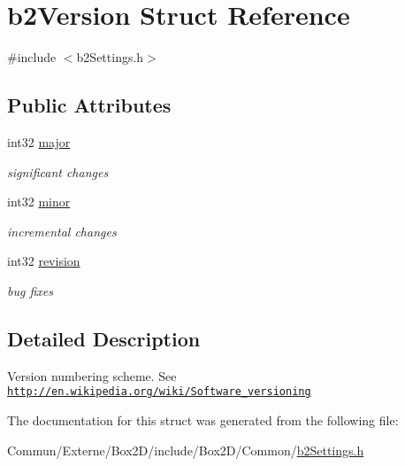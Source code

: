 \hypertarget{structb2_version}{}\section{b2\+Version Struct Reference}
\label{structb2_version}


{\ttfamily \#include $<$b2\+Settings.\+h$>$}

\subsection*{Public Attributes}
\begin{DoxyCompactItemize}
\item 
int32 \hyperlink{structb2_version_a720da8e346364d1cb34d176125380b44}{major}\hypertarget{structb2_version_a720da8e346364d1cb34d176125380b44}{}\label{structb2_version_a720da8e346364d1cb34d176125380b44}

\begin{DoxyCompactList}\small\item\em significant changes \end{DoxyCompactList}\item 
int32 \hyperlink{structb2_version_a115b8797a6e0b8e53f54502bd20d89da}{minor}\hypertarget{structb2_version_a115b8797a6e0b8e53f54502bd20d89da}{}\label{structb2_version_a115b8797a6e0b8e53f54502bd20d89da}

\begin{DoxyCompactList}\small\item\em incremental changes \end{DoxyCompactList}\item 
int32 \hyperlink{structb2_version_a395cfe1434e348115d2ead3d72b88847}{revision}\hypertarget{structb2_version_a395cfe1434e348115d2ead3d72b88847}{}\label{structb2_version_a395cfe1434e348115d2ead3d72b88847}

\begin{DoxyCompactList}\small\item\em bug fixes \end{DoxyCompactList}\end{DoxyCompactItemize}


\subsection{Detailed Description}
Version numbering scheme. See \href{http://en.wikipedia.org/wiki/Software_versioning}{\tt http\+://en.\+wikipedia.\+org/wiki/\+Software\+\_\+versioning} 

The documentation for this struct was generated from the following file\+:\begin{DoxyCompactItemize}
\item 
Commun/\+Externe/\+Box2\+D/include/\+Box2\+D/\+Common/\hyperlink{b2_settings_8h}{b2\+Settings.\+h}\end{DoxyCompactItemize}
